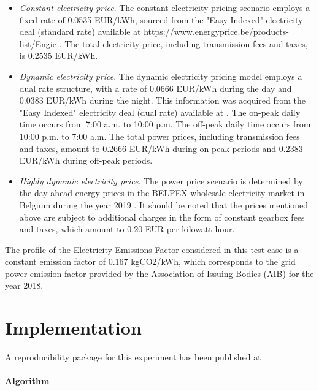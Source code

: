 \begin{itemize}
    \item \emph{Constant electricity price}. The constant electricity pricing scenario employs a fixed rate of 0.0535 EUR/kWh, sourced from the "Easy Indexed" electricity deal (standard rate) available at https://www.energyprice.be/products-list/Engie \cite{Engie}.  The total electricity price, including transmission fees and taxes, is 0.2535 EUR/kWh.
    \item \emph{Dynamic electricity price}. The dynamic electricity pricing model employs a dual rate structure, with a rate of 0.0666 EUR/kWh during the day and 0.0383 EUR/kWh during the night. This information was acquired from the "Easy Indexed" electricity deal (dual rate) available at \cite{Engie}.   The on-peak daily time occurs from 7:00 a.m. to 10:00 p.m.   The off-peak daily time occurs from 10:00 p.m. to 7:00 a.m.  The total power prices, including transmission fees and taxes, amount to 0.2666 EUR/kWh during on-peak periods and 0.2383 EUR/kWh during off-peak periods.
    \item \emph{Highly dynamic electricity price}. The power price scenario is determined by the day-ahead energy prices in the BELPEX wholesale electricity market in Belgium during the year 2019 \cite{Elexys}.  It should be noted that the prices mentioned above are subject to additional charges in the form of constant gearbox fees and taxes, which amount to 0.20 EUR per kilowatt-hour.
\end{itemize} 
The profile of the Electricity Emissions Factor considered in this test case is a constant emission factor of 0.167 kgCO2/kWh, which corresponds to the grid power emission factor provided by the Association of Issuing Bodies (AIB) for the year 2018. 

\newpage
\section{Implementation}
\label{sec:boptest-impl}

\begin{remark}
  A reproducibility package for this experiment has been published at \cite{vadimGPTcoder}
\end{remark}

\paragraph{Algorithm}

